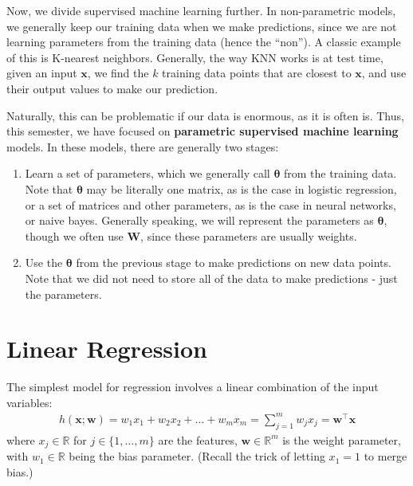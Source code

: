 \documentclass[12pt,letterpaper]{article}
\newcommand{\1}{\mathbbm{1}}
\begin{document}
Now, we divide supervised machine learning further. In non-parametric models, we generally keep our training data when we make predictions, since we are not learning parameters from the training data (hence the ``non''). A classic example of this is K-nearest neighbors. Generally, the way KNN works is at test time, given an input $\mathbf{x}$, we find the $k$ training data points that are closest to $\mathbf{x}$, and use their output values to make our prediction.

Naturally, this can be problematic if our data is enormous, as it is often is. Thus, this semester, we have focused on \textbf{parametric supervised machine learning} models. In these models, there are generally two stages:

\begin{enumerate}
    \item Learn a set of parameters, which we generally call $\mathbf{\theta}$ from the training data. Note that $\mathbf{\theta}$ may be literally one matrix, as is the case in logistic regression, or a set of matrices and other parameters, as is the case in neural networks, or naive bayes. Generally speaking, we will represent the parameters as $\mathbf{\theta}$, though we often use $\mathbf{W}$, since these parameters are usually weights.
    \item Use the $\mathbf{\theta}$ from the previous stage to make predictions on new data points. Note that we did not need to store all of the data to make predictions - just the parameters.
\end{enumerate}

\section{Linear Regression}

The simplest model for regression involves a linear combination of the input variables:
\begin{align}
    h(\mathbf{x};\mathbf{w})= w_1x_1+w_2x_2+\ldots+w_mx_m = \sum_{j=1}^m w_jx_j = \mathbf{w}^\top\mathbf{x}
\end{align}
where $x_j \in \mathbb{R}$ for $j \in \{1,\hdots,m\}$ are the features, $\mathbf{w} \in \mathbb{R}^m$ is the weight parameter, with $w_1 \in \mathbb{R}$ being the bias parameter.
(Recall the trick of letting $x_1 = 1$ to merge bias.)
\end{document}

